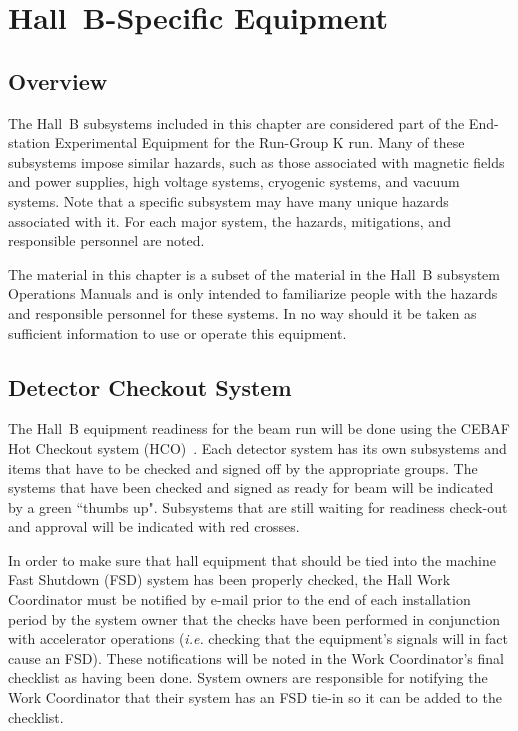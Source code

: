 \documentclass[12pt]{report}
\begin{document}
\chapter{Hall~B-Specific Equipment}

\section{Overview}

The Hall~B subsystems included in this chapter are considered part of the End-station 
Experimental Equipment for the Run-Group K run. Many of these subsystems impose similar
hazards, such as those associated with magnetic fields and power supplies, high voltage 
systems, cryogenic systems, and vacuum systems. Note that a specific subsystem may have 
many unique hazards associated with it. For each major system, the hazards, mitigations, 
and responsible personnel are noted.

The material in this chapter is a subset of the material in the Hall~B subsystem Operations 
Manuals and is only intended to familiarize people with the hazards and responsible personnel 
for these systems. In no way should it be taken as sufficient information to use or operate 
this equipment.

\section{Detector Checkout System}

The Hall~B equipment readiness for the beam run will be done using the CEBAF Hot Checkout 
system (HCO)~\cite{hco}. Each detector system has its own subsystems and items that have 
to be checked and signed off by the appropriate groups. The systems that have been checked 
and signed as ready for beam will be indicated by a green ``thumbs up". Subsystems that are 
still waiting for readiness check-out and approval will be indicated with red crosses. 

In order to make sure that hall equipment that should be tied into the machine Fast Shutdown 
(FSD) system has been properly checked, the Hall Work Coordinator must be notified by e-mail 
prior to the end of each installation period by the system owner that the checks have been 
performed in conjunction with accelerator operations ({\it i.e.} checking that the equipment's 
signals will in fact cause an FSD). These notifications will be noted in the Work Coordinator's 
final checklist as having been done. System owners are responsible for notifying the Work 
Coordinator that their system has an FSD tie-in so it can be added to the checklist.
\end{document}
